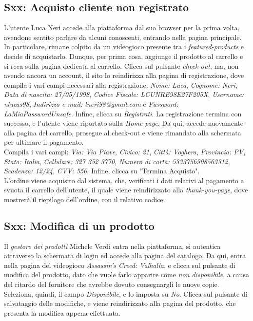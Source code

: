 \documentclass[12pt, a4paper, oneside]{book}
\begin{document}
    \subsection*{Sxx: Acquisto cliente non registrato}
    L'utente Luca Neri accede alla piattaforma dal suo browser per la prima volta, avendone sentito parlare da alcuni conoscenti, entrando nella pagina principale. In particolare, rimane colpito da un videogioco presente tra i \textit{featured-products} e decide di acquistarlo. Dunque, per prima cosa, aggiunge il prodotto al carrello e si reca sulla pagina dedicata al carrello. Clicca sul pulsante \textit{check-out}, ma, non avendo ancora un account, il sito lo reindirizza alla pagina di registrazione, dove compila i vari campi necessari alla registrazione: \textit{Nome: Luca}, \textit{Cognome: Neri}, \textit{Data di nascita: 27/05/1998}, \textit{Codice Fiscale: LCUNRE98E27F205X}, \textit{Username: nlucas98}, \textit{Indirizzo e-mail: lneri98@gmail.com} e \textit{Password: LaMiaPasswordUnsafe}. Infine, clicca su \textit{Registrati}. La registrazione termina con successo, e l'utente viene riportato sulla \textit{Home page}. Da qui, accede nuovamente alla pagina del carrello, prosegue al check-out e viene rimandato alla schermata per ultimare il pagamento.\\
    Compila i vari campi: \textit{Via: Via Piave}, \textit{Civico: 21}, \textit{Città: Voghera}, \textit{Provincia: PV}, \textit{Stato: Italia}, \textit{Cellulare: 327 352 3770}, \textit{Numero di carta: 5333756908563312}, \textit{Scadenza: 12/24}, \textit{CVV: 550}. Infine, clicca su "Termina Acquisto".\\
    L'ordine viene acquisito dal sistema, che, verificati i dati relativi al pagamento e svuota il carrello dell'utente, il quale viene reindirizzato alla \textit{thank-you-page}, dove mostrerà il riepilogo dell'ordine, con il relativo codice.

    \subsection*{Sxx: Modifica di un prodotto}
    Il \textit{gestore dei prodotti} Michele Verdi entra nella piattaforma, si autentica attraverso la schermata di login ed accede alla pagina del catalogo. Da qui, entra nella pagina del videogioco \textit{Assassin's Creed: Valhalla}, e clicca sul pulsante di modifica del prodotto, dato che vuole farlo apparire come \textit{non disponibile}, a causa del ritardo del fornitore che avrebbe dovuto consegnargli le nuove copie. Seleziona, quindi, il campo \textit{Disponibile}, e lo imposta su \textit{No}. Clicca sul pulsante di salvataggio delle modifiche, e viene reindirizzato alla pagina del prodotto, che presenta la modifica appena effettuata.
\end{document}
